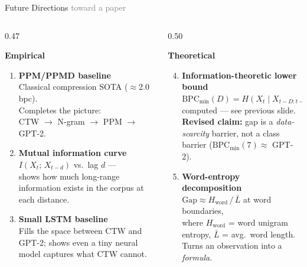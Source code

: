 \documentclass[aspectratio=169, 10pt]{beamer}
\begin{document}
\begin{frame}{Future Directions \hfill \small\textcolor{gray}{toward a paper}}

  \begin{columns}[T]
    \begin{column}{0.47\textwidth}

      \textbf{\textcolor{ctwblue}{Empirical}}
      \smallskip

      \begin{enumerate}
        \item \textbf{PPM/PPMD baseline}\\
              Classical compression SOTA ($\approx$2.0 bpc).\\
              Completes the picture:\\
              CTW $\to$ N-gram $\to$ PPM $\to$ GPT-2.

        \item \textbf{Mutual information curve}\\
              $I(X_t;\, X_{t-d})$ vs.\ lag $d$ —\\
              shows how much long-range information
              exists in the corpus at each distance.

        \item \textbf{Small LSTM baseline}\\
              Fills the space between CTW and GPT-2;
              shows even a tiny neural model captures
              what CTW cannot.
      \end{enumerate}

    \end{column}
    \begin{column}{0.50\textwidth}

      \textbf{\textcolor{gpt2green}{Theoretical}}
      \smallskip

      \begin{enumerate}
        \setcounter{enumi}{3}
        \item \textbf{Information-theoretic lower bound \checkmark}\\[2pt]
              $\mathrm{BPC}_{\min}(D) = H(X_t \mid X_{t-D{:}t-1})$
              computed — see previous slide.\\[3pt]
              \textbf{Revised claim:} gap is a \emph{data-scarcity}
              barrier, not a class barrier
              ($\mathrm{BPC}_{\min}(7) \approx$ GPT-2).

        \item \textbf{Word-entropy decomposition}\\[2pt]
              $\text{Gap} \approx H_{\text{word}}\,/\,\bar{L}$
              at word boundaries,\\
              where $H_{\text{word}}$ = word unigram entropy,
              $\bar{L}$ = avg.\ word length.\\
              Turns an observation into a \emph{formula}.
      \end{enumerate}

    \end{column}
  \end{columns}
\end{frame}
\end{document}
